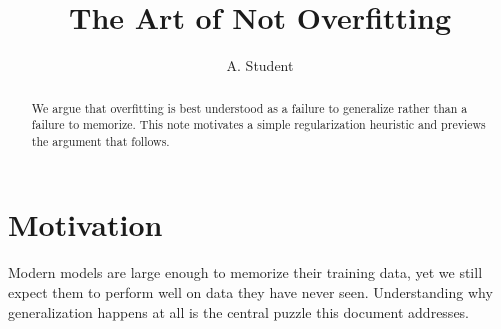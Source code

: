 \documentclass{article}
\title{The Art of Not Overfitting}
\author{A. Student}
\date{}
\begin{document}
\maketitle

\begin{abstract}
We argue that overfitting is best understood as a failure to generalize
rather than a failure to memorize. This note motivates a simple
regularization heuristic and previews the argument that follows.
\end{abstract}

\section{Motivation}

Modern models are large enough to memorize their training data, yet we
still expect them to perform well on data they have never seen.
Understanding why generalization happens at all is the central puzzle
this document addresses.
\end{document}
